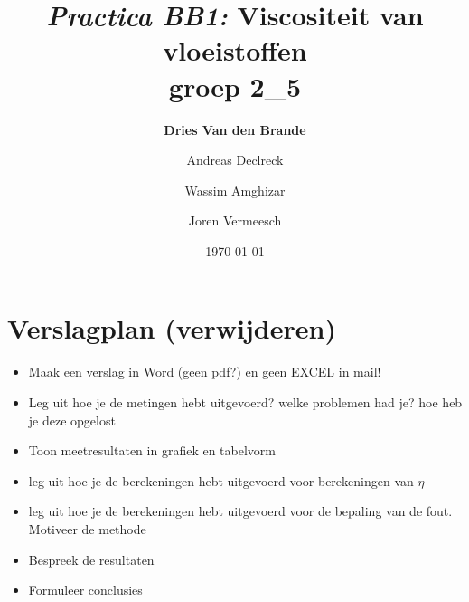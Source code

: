 \documentclass[12pt]{article}
\begin{document}
    
\title{\emph{Practica BB1:} Viscositeit van vloeistoffen\\\small{groep 2\_5}}
\author{\textbf{Dries Van den Brande} \and Andreas Declreck \and Wassim Amghizar \and Joren Vermeesch}
\date{\today}

\maketitle

\section*{Verslagplan (verwijderen)}
\begin{itemize}
    \item Maak een verslag in Word (geen pdf?) en geen EXCEL in mail!
    \item Leg uit hoe je de metingen hebt uitgevoerd? welke problemen had je? hoe heb je deze opgelost
    \item Toon meetresultaten in grafiek en tabelvorm
    \item leg uit hoe je de berekeningen hebt uitgevoerd voor berekeningen van $\eta$
    \item leg uit hoe je de berekeningen hebt uitgevoerd voor de bepaling van de fout. Motiveer de methode
    \item Bespreek de resultaten
    \item Formuleer conclusies
\end{itemize}




















\end{document}
